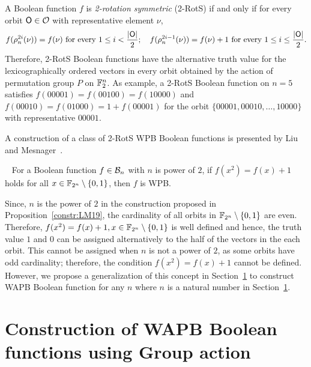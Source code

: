 \documentclass{llncs}
\begin{document}
A Boolean function $f$ is {\em 2-rotation symmetric} (2-RotS) if and only if 
for every orbit $\mathsf{O} \in \mathcal{O}$ with representative element $\nu$,
$$f(\rho_n^{2i}(\nu)) = f(\nu) \text{ for every } 1 \leq i < \frac{|\mathsf{O}|}{2}; ~~~ f(\rho_n^{2i-1}(\nu)) = f(\nu)+1 \text{ for every } 1 \leq i \leq \frac{|\mathsf{O}|}{2}.$$
Therefore, 2-RotS Boolean functions have the alternative truth value for the lexicographically ordered vectors in every orbit obtained by the action of permutation group $P$ on $\mathbb{F}_2^n$. 
As example, a 2-RotS Boolean function on $n = 5$ satisfies $f(00001) = f(00100) = f(10000)$ and $f(00010) = f(01000) = 1+f(00001)$ for the orbit $\{00001, 00010, \ldots, 10000\}$ with representative  $00001$.

A construction of a class of 2-RotS WPB Boolean functions is presented by Liu and Mesnager~\cite{DCC:LiuMes19}.
\begin{proposition} \cite{DCC:LiuMes19}~\label{constr:LM19} For a Boolean function $f \in \mathcal{B}_n$ with $n$ is power of $2$, if $f(x^2)=f(x)+1$ holds for all $x \in \mathbb{F}_{2^n} \setminus \{0,1\}$, then $f$ is WPB.  
\end{proposition}
Since, $n$ is the power of $2$ in the construction proposed in Proposition~\ref{constr:LM19}, the cardinality of all orbits in $\mathbb{F}_{2^n} \setminus \{0,1\}$ are even. Therefore, $f(x^2)=f(x)+1, x \in \mathbb{F}_{2^n} \setminus \{0,1\}$ is well defined and hence, the truth value $1$ and $0$ can be assigned alternatively to the half of the vectors in the each orbit. 
This cannot be assigned when $n$ is not a power of $2$, as some orbits have odd cardinality; therefore, the condition $f(x^2) = f(x)+1$ cannot be defined. 
However, we propose a generalization of this concept in Section~\ref{sec:GA} to construct WAPB Boolean function for any $n$ where $n$ is a natural number in Section~\ref{sec:GA}. 

\section{Construction of WAPB Boolean functions using Group action}\label{sec:GA}
\end{document}
